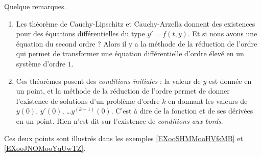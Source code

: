 \begin{remark}
    Quelque remarques.
    \begin{enumerate}
        \item
    Les théorème de Cauchy-Lipschitz et Cauchy-Arzella donnent des existences pour des équations différentielles du type \( y'=f(t,y)\). Et si nous avons une équation du second ordre ? Alors il y a la méthode de la réduction de l'ordre qui permet de transformer une équation différentielle d'ordre élevé en un système d'ordre \( 1\).
\item
    Ces théorèmes posent des \emph{conditions initiales} : la valeur de \( y\) est donnée en un point, et la méthode de la réduction de l'ordre permet de donner l'existence de solutions d'un problème d'ordre \( k\) en donnant les valeurs de \( y(0)\), \( y'(0)\), \ldots \( y^{(k-1)}(0)\). C'est à dire de la fonction et de ses dérivées en un point. Rien n'est dit sur l'existence de \emph{conditions aux bords}.
    \end{enumerate}
    Ces deux points sont illustrés dans les exemples \ref{EXooSHMMooHVfsMB} et \ref{EXooJNOMooYqUwTZ}.
\end{remark}
